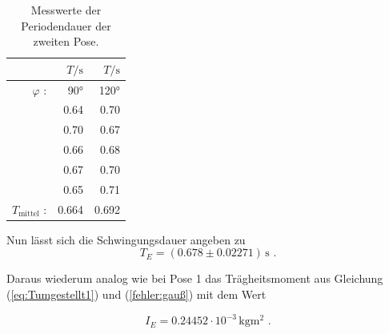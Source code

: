 \begin{table}
  \centering
  \caption{Messwerte der Periodendauer der zweiten Pose.}
  \label{tab:PeriodendauerPose2}
  \begin{tabular}{rrr}
    \toprule
    & $T / \unit\second$ &  $T / \unit\second$  \\
    \midrule
    $\varphi$ : & 90° & 120° \\
    \midrule
          & 0.64 &        0.70 \\
          & 0.70 &        0.67 \\
          & 0.66 &        0.68 \\
          & 0.67 &        0.70 \\
          & 0.65 &        0.71 \\
    \midrule
    $T_{\text{mittel}}$ : & 0.664 & 0.692 \\
    \bottomrule
    \end{tabular}
\end{table}

Nun lässt sich die Schwingungsdauer angeben zu
\begin{equation*}
  T_E = (0.678 \pm 0.02271) \, \unit\second \text{ .}
\end{equation*}

Daraus wiederum analog wie bei Pose 1 das Trägheitsmoment aus Gleichung (\ref{eq:Tumgestellt1}) und (\ref{fehler:gauß}) mit dem Wert

\begin{equation*}
  I_E = 0.24452  \cdot 10^{-3} %
  \, \unit{\kilo\gram\meter\squared} \text{ .}
\end{equation*}
